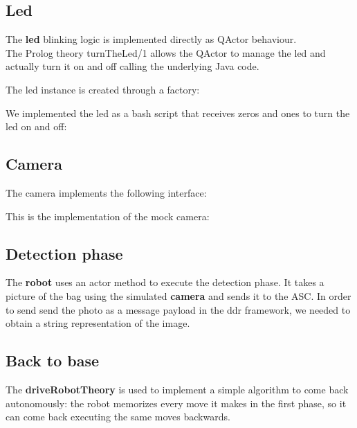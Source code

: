 \documentclass{llncs}
\begin{document}
\subsection{Led}
The \textbf{led} blinking logic is implemented directly as QActor behaviour.\\
The Prolog theory turnTheLed/1 allows the QActor to manage the led and actually turn it on and off calling the underlying Java code.

The led instance is created through a factory:

We implemented the led as a bash script that receives zeros and ones to turn the led on and off:


\subsection{Camera}
The camera implements the following interface:

This is the implementation of the mock camera:

\subsection{Detection phase}
The \textbf{robot} uses an actor method to execute the detection phase. It takes a picture of the bag using the simulated \textbf{camera} and sends it to the ASC. In order to send send the photo as a message payload in the ddr framework, we needed to obtain a string representation of the image.\\

\subsection{Back to base}
The \textbf{driveRobotTheory} is used to implement a simple algorithm to come back autonomously: the robot memorizes every move it makes in the first phase, so it can come back executing the same moves backwards.\\

\newpage
\end{document}
